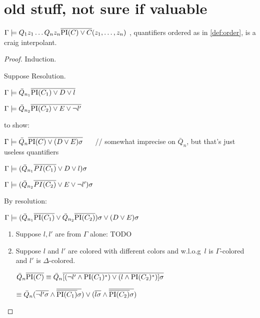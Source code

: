 \documentclass[,%
	paper=a4,%
	DIV20, 
	liststotoc,
	bibtotoc,
	draft=false,%
	numbers=noendperiod
]{scrartcl}
\begin{document}
\clearpage
\section{old stuff, not sure if valuable}

\begin{prop}
	$\Gamma \entails Q_1 z_1 \ldots Q_n z_n \overline{\PI(C) \lor C}(z_1, \ldots, z_n)$ , quantifiers ordered as in \ref{def:order}, is a craig interpolant.
\end{prop}

\begin{proof}

	Induction.

	Suppose Resolution.
	\begin{prooftree}
	\end{prooftree}

	$\Gamma \entails \bar Q_{n_1} \overline{\PI(C_1)  \lor D \lor l}$

	$\Gamma \entails \bar Q_{n_2} \overline{\PI(C_2)  \lor E \lor \lnot l'}$

	to show:

	$\Gamma \entails \bar Q_n \overline {\PI(C) \lor (D \lor E)\sigma}$ $\quad$ // somewhat imprecise on $\bar Q_n$, but that's just useless quantifiers


	$\Gamma \entails ( \bar Q_{n_1} \overline{PI(C_1)}  \lor D \lor l )\sigma$

	$\Gamma \entails (\bar Q_{n_2} \overline{PI(C_2)}  \lor E \lor \lnot l')\sigma$

	By resolution:

	$\Gamma \entails (\bar Q_{n_1} \overline{\PI(C_1)}\lor \bar Q_{n_2} \overline{\PI(C_2)})\sigma  \lor (D \lor E )\sigma$


	\begin{enumerate}
		\item Suppose $l, l'$ are from $\Gamma$ alone:
			TODO


		\item Suppose $l$ and $l'$ are colored with different colors and w.l.o.g~$l$ is $\Gamma$-colored and $l'$ is $\Delta$-colored.

			$\bar Q_n \overline{\PI(C)} \equiv \bar Q_n  \overline{[ (\lnot l' \land \PI(C_1)^*) \lor (l \land \PI(C_2)^*) ] \sigma}$

			$\equiv \bar Q_n  (\overline{\lnot l'\sigma} \land \overline{\overline{\PI(C_1)}\sigma}) \lor (\overline{l\sigma} \land \overline{\overline{\PI(C_2)}\sigma})$


\end{enumerate}
\end{proof}
\end{document}
